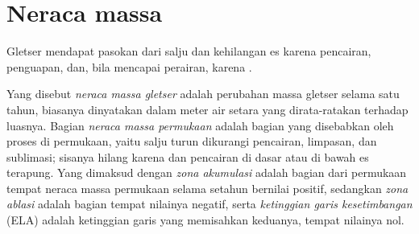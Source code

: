 \section{Neraca massa}\label{sec:b3:glaciology:mass-balance}

Gletser mendapat pasokan dari salju dan kehilangan es karena pencairan, penguapan, dan, bila
mencapai perairan, karena .

\begin{definition}\label{def:b3:glaciology:mass-balance}
Yang disebut \emph{neraca massa gletser} adalah perubahan
massa gletser selama satu tahun, biasanya dinyatakan dalam meter air
setara yang dirata-ratakan terhadap luasnya. Bagian \emph{neraca massa
permukaan} adalah bagian yang disebabkan oleh proses di
permukaan, yaitu salju turun dikurangi pencairan, limpasan, dan sublimasi; sisanya
hilang karena  dan pencairan di dasar atau di bawah es terapung.
Yang dimaksud dengan \emph{zona akumulasi} adalah bagian dari
permukaan tempat neraca massa permukaan selama setahun bernilai positif, sedangkan
\emph{zona ablasi} adalah bagian tempat nilainya negatif,
serta \emph{ketinggian garis kesetimbangan}
(ELA) adalah ketinggian garis yang memisahkan keduanya, tempat nilainya nol.
\end{definition}

